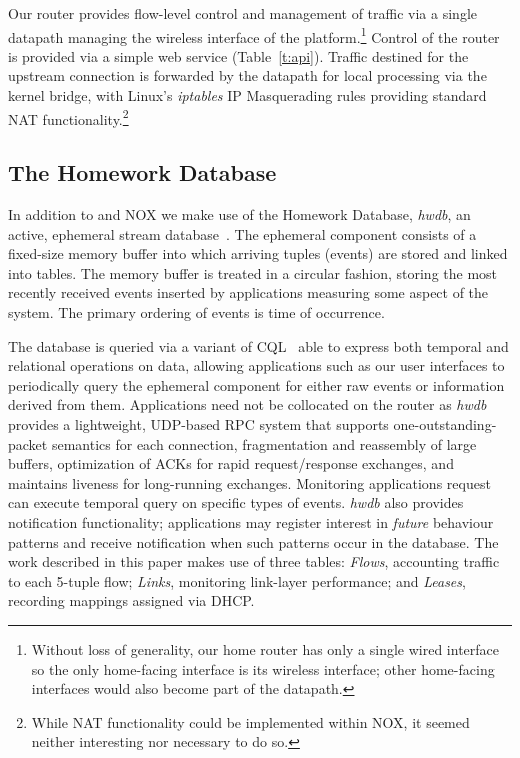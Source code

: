 Our router provides flow-level control and management of traffic via a single
\of datapath managing the wireless interface of the platform.\footnote{Without
  loss of generality, our home router has only a single wired interface so the
  only home-facing interface is its wireless interface; other home-facing
  interfaces would also become part of the \of datapath.} Control of the router
is provided via a simple web service (Table~\ref{t:api}).  Traffic destined for
the upstream connection is forwarded by the datapath for local processing via
the kernel bridge, with Linux's \emph{iptables} IP Masquerading rules providing
standard NAT functionality.\footnote{While NAT functionality could be
  implemented within NOX, it seemed neither interesting nor necessary to do so.}


\subsection{The Homework Database} \label{s:hwdb}
 
 
In addition to \ovs and NOX we make use of the Homework Database, \emph{hwdb},
an active, ephemeral stream
database~.  The
ephemeral component consists of a fixed-size memory buffer into which arriving
tuples (events) are stored and linked into tables.  The memory buffer is treated
in a circular fashion, storing the most recently received events inserted by
applications measuring some aspect of the system.  The primary ordering of
events is time of occurrence.  

The database is queried via a variant of CQL~ able to express
both temporal and relational operations on data, allowing applications such as
our user interfaces to periodically query the ephemeral component for either raw
events or information derived from them.  Applications need not be collocated on
the router as \emph{hwdb} provides a lightweight, UDP-based RPC system that
supports one-outstanding-packet semantics for each connection, fragmentation and
reassembly of large buffers, optimization of ACKs for rapid request/response
exchanges, and maintains liveness for long-running exchanges.  Monitoring
applications request can execute temporal query on specific types of events.
\emph{hwdb} also provides notification functionality; applications may register
interest in \emph{future} behaviour patterns and receive notification when such
patterns occur in the database.  The work described in this paper makes use of
three tables: \emph{Flows}, accounting traffic to each 5-tuple flow;
\emph{Links}, monitoring link-layer performance; and \emph{Leases}, recording
mappings assigned via DHCP.

